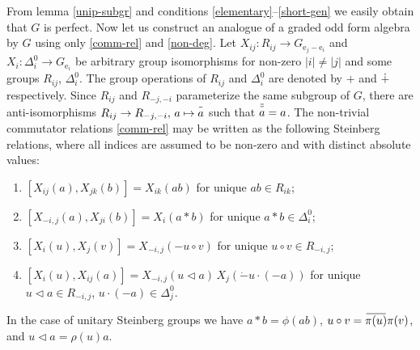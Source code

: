 \documentclass{article}
\theoremstyle{definition}
\newcommand{\dotminus}{\mathbin{\dot{-}}}
\newcommand{\inv}[1]{
    \!\;\overline{
        \!\!\:#1\vphantom !\!\!\:
    }\;\!
}
\begin{document}
From lemma \ref{unip-subgr} and conditions \ref{elementary}--\ref{short-gen} we easily obtain that \(G\) is perfect. Now let us construct an analogue of a graded odd form algebra by \(G\) using only \ref{comm-rel} and \ref{non-deg}. Let \(
    X_{ij}
    \colon R_{ij} \to G_{\mathrm e_j - \mathrm e_i}
\) and \(
    X_i \colon \Delta^0_i \to G_{\mathrm e_i}
\) be arbitrary group isomorphisms for non-zero \(
    |i| \neq |j|
\) and some groups \(R_{ij}\), \(\Delta^0_i\). The group operations of \(R_{ij}\) and \(\Delta^0_i\) are denoted by \(+\) and \(\dotplus\) respectively. Since \(R_{ij}\) and \(R_{-j, -i}\) parameterize the same subgroup of \(G\), there are anti-isomorphisms \(
    R_{ij} \to R_{-j, -i},\, a \mapsto \inv a
\) such that \(\inv{\inv a} = a\). The non-trivial commutator relations \ref{comm-rel} may be written as the following Steinberg relations, where all indices are assumed to be non-zero and with distinct absolute values:
\begin{enumerate}[label = {(St\arabic*)}, start = 1]

    \item \label{st-a2-ob} \(
        [X_{ij}(a), X_{jk}(b)] = X_{ik}(ab)
    \) for unique \(
        ab \in R_{ik}
    \);

    \item \label{st-b2-ll} \(
        [X_{-i, j}(a), X_{ji}(b)] = X_i(a * b)
    \) for unique \(
        a * b \in \Delta^0_i
    \);

    \item \label{st-b2-ss} \(
        [X_i(u), X_j(v)]
        =
        X_{-i, j}(-u \circ v)
    \) for unique \(
        u \circ v \in R_{-i, j}
    \);

    \item \label{st-b2-ob} \(
        [X_i(u), X_{ij}(a)]
        =
        X_{-i, j}(u \triangleleft a)\,
        X_j(\dotminus u \cdot (-a))
    \) for unique \(
        u \triangleleft a \in R_{-i, j}
    \), \(
        u \cdot (-a) \in \Delta^0_j
    \).

\end{enumerate}
In the case of unitary Steinberg groups we have \(
    a * b = \phi(ab)
\), \(
    u \circ v = \inv{\pi(u)} \pi(v)
\), and \(
    u \triangleleft a = \rho(u) a
\).
\end{document}
